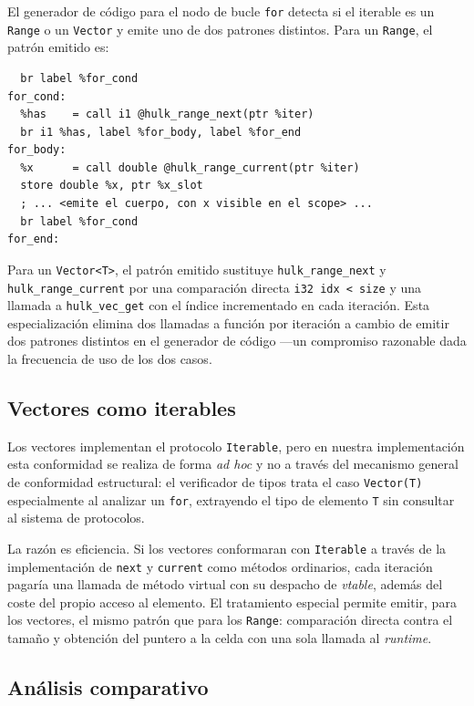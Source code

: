 \documentclass[11pt,a4paper,oneside,openany]{report}
\newcommand{\code}[1]{\texttt{#1}}
\begin{document}
El generador de código para el nodo de bucle \code{for} detecta si el
iterable es un \code{Range} o un \code{Vector} y emite uno de dos patrones
distintos. Para un \code{Range}, el patrón emitido es:

\begin{lstlisting}[style=llvmst, caption={IR generado para \code{for (x in range(s, e))}.}, label={lst:for-range}]
  %iter   = call ptr @hulk_range_alloc(double %s, double %e)
  br label %for_cond
for_cond:
  %has    = call i1 @hulk_range_next(ptr %iter)
  br i1 %has, label %for_body, label %for_end
for_body:
  %x      = call double @hulk_range_current(ptr %iter)
  store double %x, ptr %x_slot
  ; ... <emite el cuerpo, con x visible en el scope> ...
  br label %for_cond
for_end:
\end{lstlisting}

Para un \code{Vector<T>}, el patrón emitido sustituye \code{hulk\_range\_next}
y \code{hulk\_range\_current} por una comparación directa
\code{i32 idx < size} y una llamada a \code{hulk\_vec\_get} con el índice
incrementado en cada iteración. Esta especialización elimina dos llamadas a
función por iteración a cambio de emitir dos patrones distintos en el
generador de código ---un compromiso razonable dada la frecuencia de uso de
los dos casos.

\subsection{Vectores como iterables}

Los vectores implementan el protocolo \code{Iterable}, pero en nuestra
implementación esta conformidad se realiza de forma \emph{ad hoc} y no a
través del mecanismo general de conformidad estructural: el verificador de
tipos trata el caso \code{Vector(T)} especialmente al analizar un
\code{for}, extrayendo el tipo de elemento \code{T} sin consultar al
sistema de protocolos.

La razón es eficiencia. Si los vectores conformaran con \code{Iterable} a
través de la implementación de \code{next} y \code{current} como métodos
ordinarios, cada iteración pagaría una llamada de método virtual con su
despacho de \emph{vtable}, además del coste del propio acceso al elemento.
El tratamiento especial permite emitir, para los vectores, el mismo patrón
que para los \code{Range}: comparación directa contra el tamaño y obtención
del puntero a la celda con una sola llamada al \textit{runtime}.

\subsection{Análisis comparativo}
\end{document}
